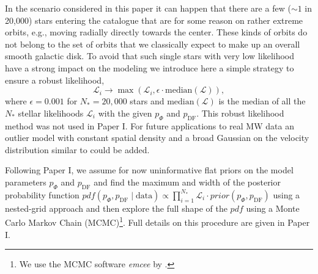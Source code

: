 \documentclass[iop,revtex4,numberedappendix,appendixfloats]{emulateapj}
\newcommand{\pdf}{\ensuremath{pdf}}
\begin{document}
In the scenario considered in this paper it can happen that there are a few ($\sim 1$ in 20,000) stars entering the catalogue that are for some reason  on rather extreme orbits, e.g., moving radially directly towards the center. These kinds of orbits do not belong to the set of orbits that we classically expect to make up an overall smooth galactic disk. To avoid that such single stars with very low likelihood have a strong impact on the modeling we introduce here a simple strategy to ensure a robust likelihood,
\begin{equation}
\mathscr{L}_i \longrightarrow \max \left( \mathscr{L}_i, \epsilon \cdot \text{median}(\mathscr{L})\right),
\end{equation}
where $\epsilon = 0.001$ for $N_*=20,000$ stars and $\text{median}(\mathscr{L})$ is the median of all the $N_*$ stellar likelihoods $\mathscr{L}_i$ with the given $p_\Phi$ and $p_\text{DF}$. This robust likelihood method was not used in Paper I. For future applications to real MW data an outlier model with constant spatial density and a broad Gaussian on the velocity distribution similar to \citet{2013ApJ...773...43B} could be added.

Following Paper I, we assume for now uninformative flat priors on the model parameters $p_\Phi$ and $p_\text{DF}$ and find the maximum and width of the posterior probability function $pdf(p_\Phi,p_\text{DF} \mid \text{data}) \propto \prod_{i=1}^{N_*} \mathscr{L}_i \cdot prior(p_\Phi,p_\text{DF})$ using a nested-grid approach and then explore the full shape of the $\pdf$ using a Monte Carlo Markov Chain (MCMC)\footnote{We use the MCMC software \emph{emcee} by \citet{2013PASP..125..306F}.}. Full details on this procedure are given in Paper I.
\end{document}
